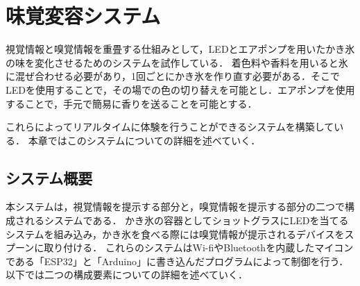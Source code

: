 \section{味覚変容システム}
視覚情報と嗅覚情報を重畳する仕組みとして，LEDとエアポンプを用いたかき氷の味を変化させるためのシステムを試作している．
着色料や香料を用いると氷に混ぜ合わせる必要があり，1回ごとにかき氷を作り直す必要がある．そこでLEDを使用することで，その場での色の切り替えを可能とし．エアポンプを使用することで，手元で簡易に香りを送ることを可能とする．

これらによってリアルタイムに体験を行うことができるシステムを構築している．
本章ではこのシステムについての詳細を述べていく．

\subsection{システム概要}
本システムは，視覚情報を提示する部分と，嗅覚情報を提示する部分の二つで構成されるシステムである．
かき氷の容器としてショットグラスにLEDを当てるシステムを組み込み，かき氷を食べる際には嗅覚情報が提示されるデバイスをスプーンに取り付ける．
これらのシステムはWi-fiやBluetoothを内蔵したマイコンである「ESP32」と「Arduino」に書き込んだプログラムによって制御を行う．
以下では二つの構成要素についての詳細を述べていく．
